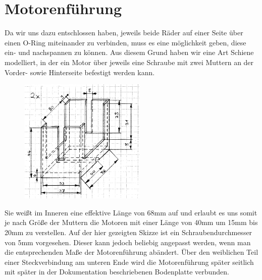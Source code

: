 \section{Motorenführung}
Da wir uns dazu entschlossen haben, jeweils beide Räder auf einer Seite über einen O-Ring miteinander zu verbinden, muss es eine möglichkeit geben, diese ein- und nachspannen zu können. Aus diesem Grund haben wir eine Art Schiene modelliert, in der ein Motor über jeweils eine Schraube mit zwei Muttern an der Vorder- sowie Hinterseite befestigt werden kann.
\begin{figure}
	\includegraphics[width=6cm,angle=0]{content/pictures/motorenfuehrung.png}
\end{figure}
Sie weißt im Inneren eine effektive Länge von 68mm auf und erlaubt es uns somit je nach Größe der Muttern die Motoren mit einer Länge von 40mm um 15mm bis 20mm zu verstellen. Auf der hier gezeigten Skizze ist ein Schraubendurchmesser von 5mm vorgesehen. Dieser kann jedoch beliebig angepasst werden, wenn man die entsprechenden Maße der Motorenführung abändert. Über den weiblichen Teil einer Steckverbindung am unteren Ende wird die Motorenführung später seitlich mit später in der Dokumentation beschriebenen Bodenplatte verbunden.

